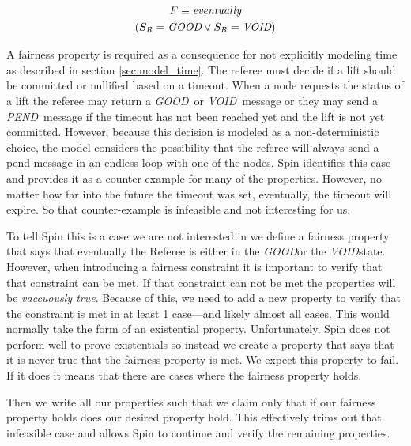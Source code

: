 \documentclass[runningheads]{llncs}
\newcommand{\refstate}{S_R}
\newcommand{\pend}{\emph{PEND}}
\newcommand{\void}{\emph{VOID}}
\newcommand{\good}{\emph{GOOD}}
\newcommand{\eventually}{\emph{eventually}}
\begin{document}
\begin{definition}
\begin{multline*}
    F \equiv \eventually \\
     (\refstate = \good \vee \refstate = \void) \\
\end{multline*}
\end{definition}
A fairness property is required as a consequence for not explicitly modeling time as described in section \ref{sec:model_time}. The referee must decide if a lift should be committed or nullified based on a timeout. When a node requests the status of a lift the referee may return a \good\ or \void\ message or they may send a \pend\ message if the timeout has not been reached yet and the lift is not yet committed. However, because this decision is modeled as a non-deterministic choice, the model considers the possibility that the referee will always send a pend message in an endless loop with one of the nodes. Spin identifies this case and provides it as a counter-example for many of the properties. However, no matter how far into the future the timeout was set, eventually, the timeout will expire. So that counter-example is infeasible and not interesting for us. 

To tell Spin this is a case we are not interested in we define a fairness property that says that eventually the Referee is either in the \good or the \void state. However, when introducing a fairness constraint it is important to verify that that constraint can be met. If that constraint can not be met the properties will be \emph{vaccuously true}. Because of this, we need to add a new property to verify that the constraint is met in at least 1 case---and likely almost all cases. This would normally take the form of an existential property. Unfortunately, Spin does not perform well to prove existentials so instead we create a property that says that it is never true that the fairness property is met. We expect this property to fail. If it does it means that there are cases where the fairness property holds.

Then we write all our properties such that we claim only that if our fairness property holds does our desired property hold. This effectively trims out that infeasible case and allows Spin to continue and verify the remaining properties. 
\end{document}
